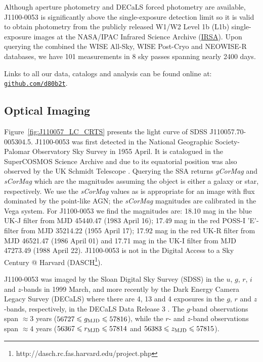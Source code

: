 \documentclass[a4paper,fleqn,usenatbib]{mnras}
\begin{document}
Although aperture photometry and DECaLS forced photometry
\citep{Lang2014, Meisner2017a, Meisner2017b} are available, J1100-0053
is significantly above the single-exposure detection limit so it is
valid to obtain photometry from the publicly released W1/W2 Level 1b
(L1b) single-exposure images at the NASA/IPAC Infrared Science Archive
(\href{http://irsa.ipac.caltech.edu/}{IRSA}).  Upon querying the
combined the WISE All-Sky, WISE Post-Cryo and NEOWISE-R databases, we
have 101 measurements in 8 sky passes spanning nearly 2400 days.

Links to all our data, catalogs and analysis can be found
online at: \href{https://github.com/d80b2t}{{\tt github.com/d80b2t}}.


\subsection{Optical Imaging}
Figure~\ref{fig:J110057_LC_CRTS} presents the light curve of SDSS
J110057.70-005304.5.  J1100-0053 was first detected in the National
Geographic Society-Palomar Observatory Sky Survey \cite[NGS-POSS;
][]{Abell1959, Minkowski_Abell1963book} in 1955 April. It is
catalogued in the SuperCOSMOS Science Archive
\citep[\href{http://ssa.roe.ac.uk/}{SSA}; ][]{Hambly2001_I,
Hambly2001_II} and due to its equatorial position was also observed by
the UK Schmidt Telescope \cite[UKST; ][]{Cannon1975,
Cannon1979book}. Querying the SSA returns {\it gCorMag} and {\it
sCorMag} which are the magnitudes assuming the object is either a
galaxy or star, respectively. We use the {\it sCorMag} values as is
appropriate for an image with flux dominated by the point-like AGN;
the {\it sCorMag} magnitudes are calibrated in the Vega system. For
J1100-0053 we find the magnitudes are: 18.10 mag in the blue UK-J
filter from MJD 45440.47 (1983 April 16); 17.49 mag in the red POSS-I
'E'-filter from MJD 35214.22 (1955 April 17); 17.92 mag in the red
UK-R filter from MJD 46521.47 (1986 April 01) and 17.71 mag in the
UK-I filter from MJD 47273.49 (1988 April 22). J1100-0053 is not in
the Digital Access to a Sky Century @ Harvard
(DASCH\footnote{http://dasch.rc.fas.harvard.edu/project.php}).

J1100-0053 was imaged by the Sloan Digital Sky Survey (SDSS) in the
$u$, $g$, $r$, $i$ and $z$-bands in 1999 March, and more recently by
the Dark Energy Camera Legacy Survey (DECaLS) where there are 4, 13
and 4 exposures in the $g$, $r$ and $z$-bands, respectively, in the
DECaLS Data Release 3 \citep[DR3; ][]{Dey2018}. The $g$-band
observations span $\approx$3 years ($56727 \leq g_{\rm MJD} \leq
57816$), while the $r$- and $z$-band observations span $\approx$4
years ($56367 \leq r_{\rm MJD} \leq 57814$ and $56383 \leq z_{\rm MJD}
\leq 57815$).
\end{document}

